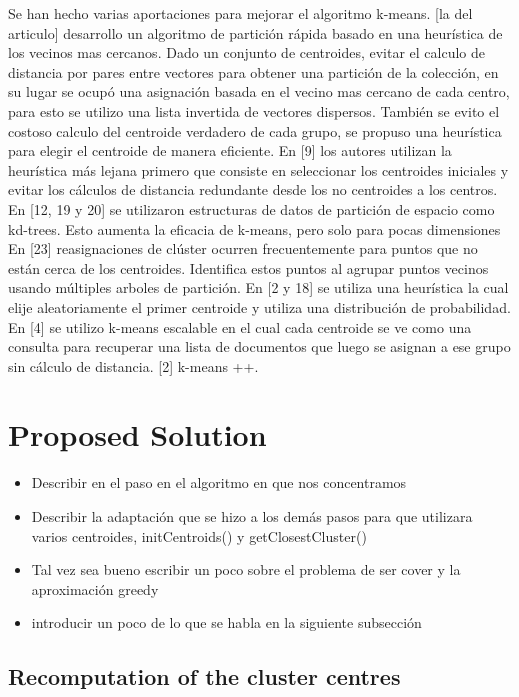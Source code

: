 \documentclass[runningheads]{llncs}
\begin{document}
Se han hecho varias aportaciones para mejorar el algoritmo k-means.
[la del articulo] desarrollo un algoritmo de partición rápida basado en una heurística de los vecinos mas cercanos. Dado un conjunto de centroides, evitar el calculo de distancia por pares entre vectores para obtener una partición de la colección, en su lugar se ocupó una asignación basada en el vecino mas cercano de cada centro, para esto se utilizo una lista invertida de vectores dispersos.
También se evito el costoso calculo del centroide verdadero de cada grupo, se propuso una heurística para elegir el centroide de manera eficiente.
En [9] los autores utilizan la heurística más lejana primero que consiste en seleccionar los centroides iniciales y evitar los cálculos de distancia redundante desde los no centroides a los centros.
En [12, 19 y 20] se utilizaron estructuras de datos de partición de espacio como kd-trees. Esto aumenta la eficacia de k-means, pero solo para pocas dimensiones
En [23] reasignaciones de clúster ocurren frecuentemente para puntos que no están cerca de los centroides. Identifica estos puntos al agrupar puntos vecinos usando múltiples arboles de partición.
En [2 y 18] se utiliza una heurística la cual elije aleatoriamente el primer centroide y utiliza una distribución de probabilidad.
En [4] se utilizo k-means escalable en el cual cada centroide se ve como una consulta para recuperar una lista de documentos que luego se asignan a ese grupo sin cálculo de distancia.
[2] k-means ++.\cite{manning_2009}

\section{Proposed Solution}

\begin{itemize}
\item Describir en el paso en el algoritmo en que nos concentramos
\item Describir la adaptación que se hizo a los demás pasos para que utilizara varios
centroides, initCentroids() y getClosestCluster()
\item Tal vez sea bueno escribir un poco sobre el problema de ser cover y la aproximación greedy
\item introducir un poco de lo que se habla en la siguiente subsección
\end{itemize}

\subsection{Recomputation of the cluster centres}
\end{document}
